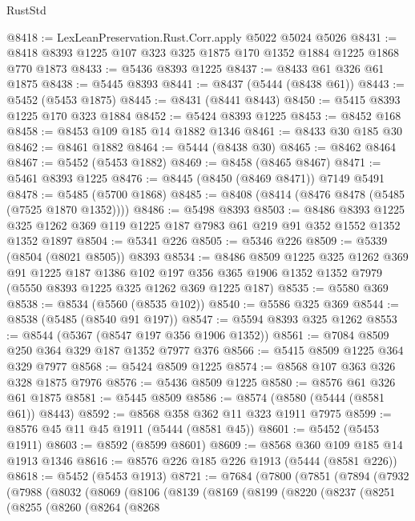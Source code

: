 \begin{lexlean}{RustStd}
\begin{coremodule}
@8418 := LexLeanPreservation.Rust.Corr.apply @5022 @5024 @5026
@8431 := @8418 @8393 @1225 @107 @323 @325 @1875 @170 @1352 @1884 @1225 @1868 @770 @1873
@8433 := @5436 @8393 @1225
@8437 := @8433 @61 @326 @61 @1875
@8438 := @5445 @8393
@8441 := @8437 (@5444 (@8438 @61))
@8443 := @5452 (@5453 @1875)
@8445 := @8431 (@8441 @8443)
@8450 := @5415 @8393 @1225 @170 @323 @1884
@8452 := @5424 @8393 @1225
@8453 := @8452 @168
@8458 := @8453 @109 @185 @14 @1882 @1346
@8461 := @8433 @30 @185 @30
@8462 := @8461 @1882
@8464 := @5444 (@8438 @30)
@8465 := @8462 @8464
@8467 := @5452 (@5453 @1882)
@8469 := @8458 (@8465 @8467)
@8471 := @5461 @8393 @1225
@8476 := @8445 (@8450 (@8469 @8471)) @7149 @5491
@8478 := @5485 (@5700 @1868)
@8485 := @8408 (@8414 (@8476 @8478 (@5485 (@7525 @1870 @1352))))
@8486 := @5498 @8393
@8503 := @8486
    @8393
    @1225
    @325
    @1262
    @369
    @119
    @1225
    @187
    @7983
    @61
    @219
    @91
    @352
    @1552
    @1352
    @1352
    @1897
@8504 := @5341 @226
@8505 := @5346 @226
@8509 := @5339 (@8504 (@8021 @8505)) @8393
@8534 := @8486
    @8509
    @1225
    @325
    @1262
    @369
    @91
    @1225
    @187
    @1386
    @102
    @197
    @356
    @365
    @1906
    @1352
    @1352
    @7979
    (@5550 @8393 @1225 @325 @1262 @369 @1225 @187)
@8535 := @5580 @369
@8538 := @8534 (@5560 (@8535 @102))
@8540 := @5586 @325 @369
@8544 := @8538 (@5485 (@8540 @91 @197))
@8547 := @5594 @8393 @325 @1262
@8553 := @8544 (@5367 (@8547 @197 @356 @1906 @1352))
@8561 := @7084 @8509 @250 @364 @329 @187 @1352 @7977 @376
@8566 := @5415 @8509 @1225 @364 @329 @7977
@8568 := @5424 @8509 @1225
@8574 := @8568 @107 @363 @326 @328 @1875 @7976
@8576 := @5436 @8509 @1225
@8580 := @8576 @61 @326 @61 @1875
@8581 := @5445 @8509
@8586 := @8574 (@8580 (@5444 (@8581 @61)) @8443)
@8592 := @8568 @358 @362 @11 @323 @1911 @7975
@8599 := @8576 @45 @11 @45 @1911 (@5444 (@8581 @45))
@8601 := @5452 (@5453 @1911)
@8603 := @8592 (@8599 @8601)
@8609 := @8568 @360 @109 @185 @14 @1913 @1346
@8616 := @8576 @226 @185 @226 @1913 (@5444 (@8581 @226))
@8618 := @5452 (@5453 @1913)
@8721 := @7684
    (@7800
      (@7851
        (@7894
          (@7932
            (@7988
              (@8032
                (@8069
                  (@8106
                    (@8139
                      (@8169
                        (@8199
                          (@8220
                            (@8237
                              (@8251
                                (@8255
                                  (@8260
                                    (@8264
                                      (@8268

\end{coremodule}
\end{lexlean}
